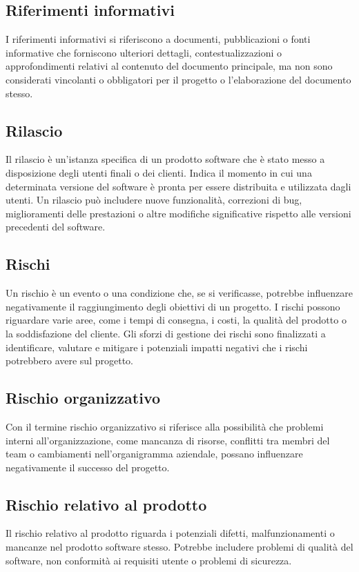 \subsection*{Riferimenti informativi} 
I riferimenti informativi si riferiscono a documenti, pubblicazioni o fonti informative che forniscono ulteriori dettagli, contestualizzazioni o approfondimenti relativi al contenuto del documento principale, ma non sono considerati vincolanti o obbligatori per il progetto o l'elaborazione del documento stesso.
\subsection*{Rilascio} 
Il rilascio è un'istanza specifica di un prodotto software che è stato messo a disposizione degli utenti finali o dei clienti. Indica il momento in cui una determinata versione del software è pronta per essere distribuita e utilizzata dagli utenti. Un rilascio può includere nuove funzionalità, correzioni di bug, miglioramenti delle prestazioni o altre modifiche significative rispetto alle versioni precedenti del software. 
\subsection*{Rischi} 
Un rischio è un evento o una condizione che, se si verificasse, potrebbe influenzare negativamente il raggiungimento degli obiettivi di un progetto. I rischi possono riguardare varie aree, come i tempi di consegna, i costi, la qualità del prodotto o la soddisfazione del cliente. Gli sforzi di gestione dei rischi sono finalizzati a identificare, valutare e mitigare i potenziali impatti negativi che i rischi potrebbero avere sul progetto. 
\subsection*{Rischio organizzativo} 
Con il termine rischio organizzativo si riferisce alla possibilità che problemi interni all'organizzazione, come mancanza di risorse, conflitti tra membri del team o cambiamenti nell'organigramma aziendale, possano influenzare negativamente il successo del progetto.
\subsection*{Rischio relativo al prodotto} 
Il rischio relativo al prodotto riguarda i potenziali difetti, malfunzionamenti o mancanze nel prodotto software stesso. Potrebbe includere problemi di qualità del software, non conformità ai requisiti utente o problemi di sicurezza.
